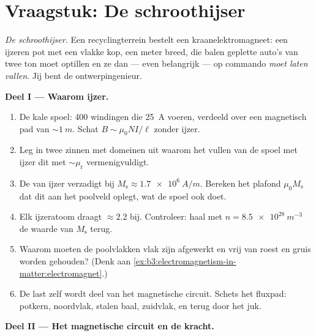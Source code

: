 \section{Vraagstuk: De schroothijser}

\begin{problem}\label{pb:b3:electromagnetism-in-matter:1}
\emph{De schroothijser.} Een recyclingterrein bestelt een
kraanelektromagneet: een ijzeren pot met een vlakke kop, een meter breed, die
balen geplette auto's van twee ton moet optillen en ze dan --- even belangrijk ---
op commando \emph{moet laten vallen}. Jij bent de ontwerpingenieur.

\medskip\noindent\textbf{Deel I --- Waarom ijzer.}

\begin{enumerate}
  \item De kale spoel: 400 windingen die \qty{25}{A} voeren, verdeeld over
        een magnetisch pad van $\sim\qty{1}{m}$. Schat $B \sim
        \mu_0NI/\ell$ zonder ijzer.
  \item Leg in twee zinnen met domeinen uit waarom het vullen van de
        spoel met ijzer dit met $\sim\mu_{\text{r}}$ vermenigvuldigt.
  \item De  van ijzer verzadigt bij $M_{\text{s}} \approx
        \qty{1.7e6}{A/m}$. Bereken het plafond $\mu_0M_{\text{s}}$
        dat dit aan het poolveld oplegt, wat de spoel ook doet.
  \item Elk ijzeratoom draagt $\approx 2.2$  bij.
        Controleer: haal met $n = \qty{8.5e28}{m^{-3}}$ de waarde van
        $M_{\text{s}}$ terug.
  \item Waarom moeten de poolvlakken vlak zijn afgewerkt en vrij van
        roest en gruis worden gehouden? (Denk aan
        \cref{ex:b3:electromagnetism-in-matter:electromagnet}.)
  \item De last zelf wordt deel van het magnetische circuit.
        Schets het fluxpad: potkern, noordvlak, stalen baal,
        zuidvlak, en terug door het juk.
\end{enumerate}

\medskip\noindent\textbf{Deel II --- Het magnetische circuit en de kracht.}


\end{problem}

